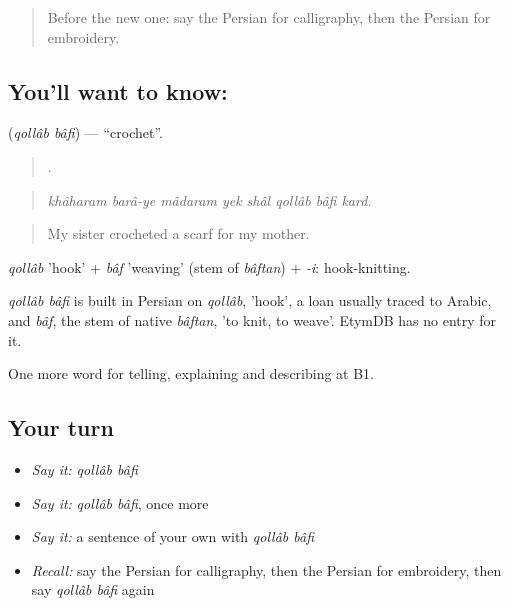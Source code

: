 \label{lesson:FA-C508-qollab-bafi}



\begin{quote}
Before the new one: say the Persian for calligraphy, then the Persian for embroidery.
\end{quote}

\subsection*{You'll want to know:  }
\textbf{ } (\emph{qollâb bâfi}) — \textquotedblleft{}crochet\textquotedblright{}.

\begin{quote}
       .
\end{quote}

\begin{quote}
\emph{khâharam barâ-ye mâdaram yek shâl qollâb bâfi kard.}
\end{quote}

\begin{quote}
My sister crocheted a scarf for my mother.
\end{quote}

\emph{qollâb} 'hook' + \emph{bâf} 'weaving' (stem of \emph{bâftan}) + \emph{-i}: hook-knitting.

\begin{cousinweb}
\emph{qollâb bâfi} is built in Persian on \emph{qollâb}, 'hook', a loan usually traced to Arabic, and \emph{bâf}, the stem of native \emph{bâftan}, 'to knit, to weave'. EtymDB has no entry for it.
\end{cousinweb}

\begin{grammarlens}[title={What you've built}]
One more word for telling, explaining and describing at B1.
\end{grammarlens}

\subsection*{Your turn}
\begin{itemize}
\raggedright
  \item \emph{Say it:} \emph{qollâb bâfi}
  \item \emph{Say it:} \emph{qollâb bâfi}, once more
  \item \emph{Say it:} a sentence of your own with \emph{qollâb bâfi}
  \item \emph{Recall:} say the Persian for calligraphy, then the Persian for embroidery, then say \emph{qollâb bâfi} again
\end{itemize}


